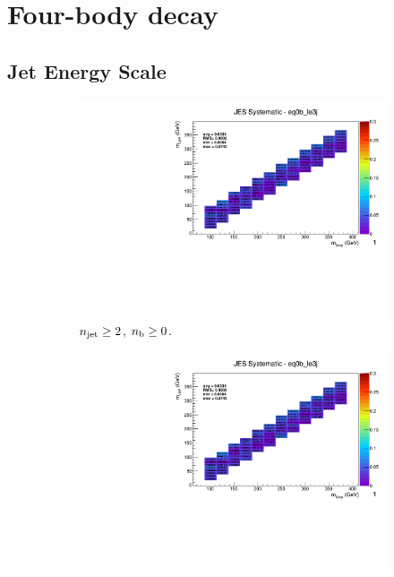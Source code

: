 \clearpage
\section*{Four-body decay}
\label{sec:t2degen_syst_plots}

\subsection*{Jet Energy Scale}
\label{sec:t2degen_jes_plots}

\begin{figure}[ht!]
  \centering
  \begin{subfigure}[b]{0.32\textwidth}
    \includegraphics[width=\textwidth, page=14]{Figs/sms/t2degen/v19_3/systs/T2_4body_JES_eq0b_le3j.pdf}
    \caption{$n_{\text{jet}} \geq 2$, $n_{\text{b}} \geq 0$.}
  \end{subfigure}
  \begin{subfigure}[b]{0.32\textwidth}
    \includegraphics[width=\textwidth, page=9]{Figs/sms/t2degen/v19_3/systs/T2_4body_JES_eq0b_le3j.pdf}

\end{subfigure}
\end{figure}
